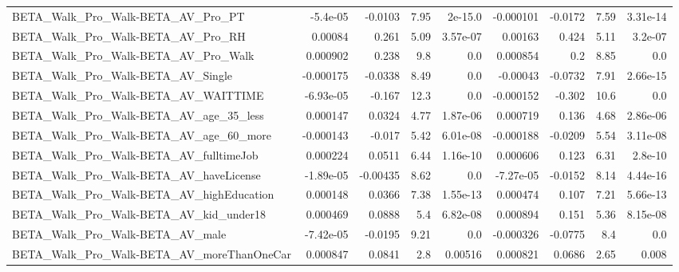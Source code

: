 \begin{tabular}{lrrrrrrrr}
BETA\_Walk\_Pro\_Walk-BETA\_AV\_Pro\_PT                  &    -5.4e-05 &      -0.0103 &      7.95 &  2e-15.0 &  -0.000101 &     -0.0172 &         7.59 &      3.31e-14 \\
BETA\_Walk\_Pro\_Walk-BETA\_AV\_Pro\_RH                  &     0.00084 &        0.261 &      5.09 & 3.57e-07 &    0.00163 &       0.424 &         5.11 &       3.2e-07 \\
BETA\_Walk\_Pro\_Walk-BETA\_AV\_Pro\_Walk                &    0.000902 &        0.238 &       9.8 &      0.0 &   0.000854 &         0.2 &         8.85 &           0.0 \\
BETA\_Walk\_Pro\_Walk-BETA\_AV\_Single                  &   -0.000175 &      -0.0338 &      8.49 &      0.0 &   -0.00043 &     -0.0732 &         7.91 &      2.66e-15 \\
BETA\_Walk\_Pro\_Walk-BETA\_AV\_WAITTIME                &   -6.93e-05 &       -0.167 &      12.3 &      0.0 &  -0.000152 &      -0.302 &         10.6 &           0.0 \\
BETA\_Walk\_Pro\_Walk-BETA\_AV\_age\_35\_less             &    0.000147 &       0.0324 &      4.77 & 1.87e-06 &   0.000719 &       0.136 &         4.68 &      2.86e-06 \\
BETA\_Walk\_Pro\_Walk-BETA\_AV\_age\_60\_more             &   -0.000143 &       -0.017 &      5.42 & 6.01e-08 &  -0.000188 &     -0.0209 &         5.54 &      3.11e-08 \\
BETA\_Walk\_Pro\_Walk-BETA\_AV\_fulltimeJob             &    0.000224 &       0.0511 &      6.44 & 1.16e-10 &   0.000606 &       0.123 &         6.31 &       2.8e-10 \\
BETA\_Walk\_Pro\_Walk-BETA\_AV\_haveLicense             &   -1.89e-05 &     -0.00435 &      8.62 &      0.0 &  -7.27e-05 &     -0.0152 &         8.14 &      4.44e-16 \\
BETA\_Walk\_Pro\_Walk-BETA\_AV\_highEducation           &    0.000148 &       0.0366 &      7.38 & 1.55e-13 &   0.000474 &       0.107 &         7.21 &      5.66e-13 \\
BETA\_Walk\_Pro\_Walk-BETA\_AV\_kid\_under18             &    0.000469 &       0.0888 &       5.4 & 6.82e-08 &   0.000894 &       0.151 &         5.36 &      8.15e-08 \\
BETA\_Walk\_Pro\_Walk-BETA\_AV\_male                    &   -7.42e-05 &      -0.0195 &      9.21 &      0.0 &  -0.000326 &     -0.0775 &          8.4 &           0.0 \\
BETA\_Walk\_Pro\_Walk-BETA\_AV\_moreThanOneCar          &    0.000847 &       0.0841 &       2.8 &  0.00516 &   0.000821 &      0.0686 &         2.65 &         0.008 \\

\end{tabular}
